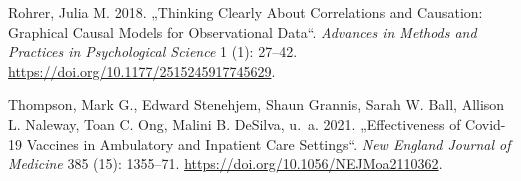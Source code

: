 \documentclass[
  a4paper,
  DIV=11]{scrreprt}
\newlength{\cslhangindent}
\newlength{\cslentryspacingunit} %
\newenvironment{CSLReferences}[2] %
 {%
  \setlength{\parindent}{0pt}
  \ifodd #1
  \let\oldpar\par
  \def\par{\hangindent=\cslhangindent\oldpar}
  \fi
  \setlength{\parskip}{#2\cslentryspacingunit}
 }%
 {}
\theoremstyle{definition}
\theoremstyle{remark}
\begin{document}
\begin{CSLReferences}{1}{0}
\leavevmode{}%
Rohrer, Julia M. 2018. {„Thinking Clearly About Correlations and
Causation: Graphical Causal Models for Observational Data``}.
\emph{Advances in Methods and Practices in Psychological Science} 1 (1):
27--42. \url{https://doi.org/10.1177/2515245917745629}.

\leavevmode{}%
Thompson, Mark G., Edward Stenehjem, Shaun Grannis, Sarah W. Ball,
Allison L. Naleway, Toan C. Ong, Malini B. DeSilva, u.~a. 2021.
{„Effectiveness of Covid-19 Vaccines in Ambulatory and Inpatient Care
Settings``}. \emph{New England Journal of Medicine} 385 (15): 1355--71.
\url{https://doi.org/10.1056/NEJMoa2110362}.

\end{CSLReferences}
\end{document}
